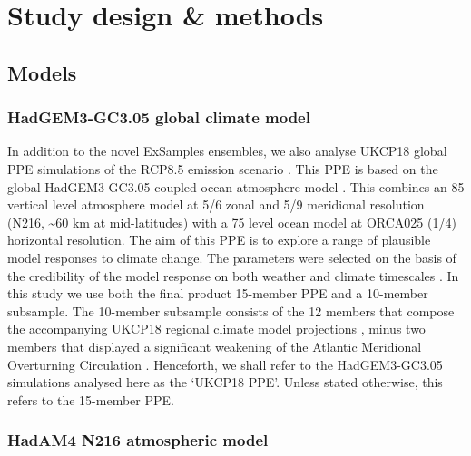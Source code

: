\section{Study design \& methods}\label{ch5:methods}

  \subsection{Models}
  
    \subsubsection{HadGEM3-GC3.05 global climate model}

      In addition to the novel ExSamples ensembles, we also analyse UKCP18 global PPE simulations of the RCP8.5 emission scenario \citep{riahi_rcp_2011}. This PPE is based on the global HadGEM3-GC3.05 coupled ocean atmosphere model \citep{murphy_ukcp18_2018,williams_met_2018}. This combines an 85 vertical level atmosphere model at 5/6\textdegree{} zonal and 5/9\textdegree{} meridional resolution (N216, \textasciitilde60 km at mid-latitudes) with a 75 level ocean model at ORCA025 (1/4\textdegree) horizontal resolution. The aim of this PPE is to explore a range of plausible model responses to climate change. The parameters were selected on the basis of the credibility of the model response on both weather and climate timescales \citep{karmalkar_finding_2019,sexton_finding_2019,sexton_perturbed_2021,yamazaki_perturbed_2021}. In this study we use both the final product 15-member PPE and a 10-member subsample. The 10-member subsample consists of the 12 members that compose the accompanying UKCP18 regional climate model projections \citep{murphy_ukcp18_2018}, minus two members that displayed a significant weakening of the Atlantic Meridional Overturning Circulation \citep{sexton_assessment_2020}. Henceforth, we shall refer to the HadGEM3-GC3.05 simulations analysed here as the `UKCP18 PPE'. Unless stated otherwise, this refers to the 15-member PPE.
    
    \subsubsection{HadAM4 N216 atmospheric model}

